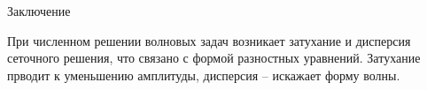 \documentclass[10pt,xcolor=pst,aspectratio=169]{beamer}
\begin{document}
%
%
%
%
%

\begin{frame}{Заключение}

    \transdissolve[duration=0.1]
    \justifying
    \large

    При численном решении волновых задач возникает затухание и дисперсия сеточного решения, что связано с формой разностных уравнений. Затухание прводит к уменьшению амплитуды, дисперсия -- искажает форму волны.

\end{frame}
\end{document}
